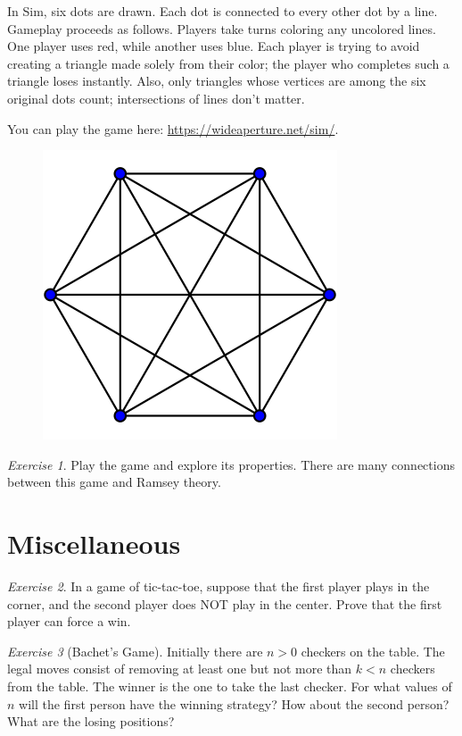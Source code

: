 \documentclass{article}
\theoremstyle{definition}
\theoremstyle{remark}
\newtheorem{exercise}{Exercise}
\begin{document}
    In Sim, six dots are drawn.
    Each dot is connected to every other dot by a line.
    Gameplay proceeds as follows.
    Players take turns coloring any uncolored lines.
    One player uses red, while another uses blue.
    Each player is trying to avoid creating a triangle made solely from their color; the player who completes such a triangle loses instantly.
    Also, only triangles whose vertices are among the six original dots count; intersections of lines don't matter.

    You can play the game here: \url{https://wideaperture.net/sim/}.

    \begin{figure}[hbt!]
        \small
        \centering
        \includegraphics[scale = 0.4]{Pics/sim.png}
    \end{figure}

    \begin{exercise}
        Play the game and explore its properties.
        There are many connections between this game and Ramsey theory.
    \end{exercise}

\section{Miscellaneous}

    \begin{exercise}
        In a game of tic-tac-toe, suppose that the first player plays in the corner, and the second player does NOT play in the center.
        Prove that the first player can force a win.
    \end{exercise}

    \begin{exercise}[Bachet's Game]
        Initially there are \(n>0\) checkers on the table.
        The legal moves consist of removing at least one but not more than \(k<n\) checkers from the table.
        The winner is the one to take the last checker.
        For what values of \(n\) will the first person have the winning strategy?
        How about the second person?
        What are the losing positions?
    \end{exercise}
\end{document}
